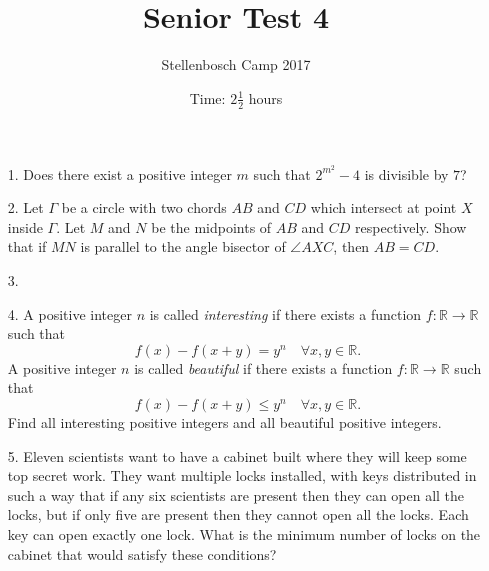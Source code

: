 \documentclass[12pt]{article}
\title{Senior Test 4}
\author{Stellenbosch Camp 2017}
\date{Time: $2\frac{1}{2}$ hours}
\begin{document}
 \maketitle

\begin{enumerate}

\item[1.] %
Does there exist a positive integer $m$ such that $2^{m^2} - 4$ is divisible by $7$?


\item[2.] %
Let $\Gamma$ be a circle with two chords $AB$ and $CD$ which intersect at point $X$ inside $\Gamma$. Let $M$ and $N$ be the midpoints of $AB$ and $CD$ respectively. Show that if $MN$ is parallel to the angle bisector of $\angle AXC$, then $AB = CD$.


\item[3.] %


\item[4.] %
A positive integer $n$ is called \emph{interesting} if there exists a function $f : \mathbb{R} \to \mathbb{R}$ such that
  \[ f(x) - f(x+y) = y^n \quad \forall x,y \in \mathbb{R}. \]
A positive integer $n$ is called \emph{beautiful} if there exists a function $f : \mathbb{R} \to\mathbb{R}$ such that
  \[ f(x) - f(x+y) \leq y^n \quad \forall x,y \in \mathbb{R}. \]
Find all interesting positive integers and all beautiful positive integers.
 

\item[5.] %
Eleven scientists want to have a cabinet built where they will keep some top secret work. They want multiple locks installed, with keys distributed in such a way that if any six scientists are present then they can open all the locks, but if only five are present then they cannot open all the locks. Each key can open exactly one lock. What is the minimum number of locks on the cabinet that would satisfy these conditions?


\end{enumerate}
\end{document}
